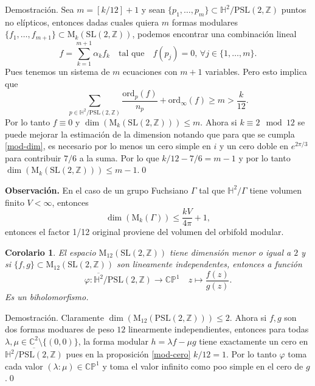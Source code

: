 \documentclass[letterpaper]{article}
\newtheorem{cor}[teorema]{Corolario}
\newcommand{\obs}{{\noindent \sc \textbf{Observación. }}}
\newcommand{\dem}{{\noindent \sc Demostraci\'on. }}
\newcommand{\ga}{\ensuremath{\Gamma}}
\newcommand{\co}{\ensuremath{\mathbb C }}
\newcommand{\cp}{\ensuremath{\mathbb{CP}}}
\newcommand{\pslz}{\ensuremath{\mathrm{PSL}(2,\mathbb Z) }}
\newcommand{\hd}{\ensuremath{\mathbb H^2}}
\newcommand{\slz}{\ensuremath{\mathrm{SL}(2,\mathbb Z) }}
\newcommand{\mdlr}{\ensuremath{\mathrm{M}}}
\begin{document}
\dem Sea \(m=[k/12]+1\) y sean \(\{p_1,\dots,p_m\}\subset\hd/\pslz\) puntos no elípticos, entonces dadas cuales quiera \(m\) formas modulares \(\{f_1,\dots,f_{m+1}\}\subset\mdlr_k(\slz)\), podemos encontrar una combinación lineal
\[
    f=\sum_{k=1}^{m+1}\alpha_kf_k\quad\text{tal que}\quad f(p_j)=0,\,\forall j\in\{1,\dots,m\}.
\]
Pues tenemos un sistema de \(m\) ecuaciones con \(m+1\) variables. Pero esto implica que
\[
    \sum_{p\in\hd/\pslz} \frac{\mathrm{ord}_p(f)}{n_p}+\mathrm{ord}_{\infty}(f)\geq m>\frac{k}{12}.
\]
Por lo tanto \(f\equiv0\) y \(\dim(\mdlr_k(\slz))\leq m\). Ahora si \(k\equiv2\mod12\) se puede mejorar la estimación de la dimension notando que para que se cumpla \ref{mod-dim}, es necesario por lo menos un cero simple en \(i\) y un cero doble en \(e^{2\pi/3}\) para contribuir \(7/6\) a la suma. Por lo que \(k/12-7/6=m-1\) y  por lo tanto \(\dim(\mdlr_k(\slz))\leq m-1\).\qed

\obs En el caso de un grupo Fuchsiano \(\ga\) tal que \(\hd/\ga\) tiene volumen finito \(V<\infty\), entonces
\[
    \dim(\mdlr_k(\ga))\leq \frac{kV}{4\pi}+1,
\]
entonces el factor 1/12 original proviene del volumen del orbifold modular.
\begin{cor}
El espacio \(\mdlr_{12}(\slz)\) tiene dimensión menor o igual a \(2\) y si \(\{f,g\}\subset\mdlr_{12}(\slz)\) son lineamente independentes, entonces a función
\[
        \varphi:\overline{\hd}/\pslz\rightarrow\cp^{1}\quad z\mapsto\frac{f(z)}{g(z)}.
\]
Es un biholomorfismo.
\end{cor}
\dem Claramente \(\dim(\mdlr_{12}(\pslz))\leq2\). Ahora si \(f,g\) son dos formas moduares de peso \(12\) linearmente independientes, entonces para todas \(\lambda,\mu\in\co^{2}\setminus\{(0,0)\}\), la forma modular \(h=\lambda f-\mu g\) tiene exactamente un cero en \(\overline{\hd/\pslz}\) pues en la proposición \ref{mod-cero} \(k/12=1\). Por lo tanto \(\varphi\) toma cada valor \((\lambda:\mu)\in\cp^1\) y toma el valor infinito como poo simple en el cero de \(g\).\qed
\end{document}
